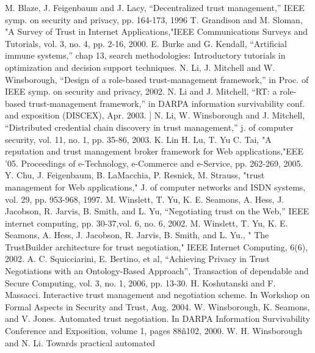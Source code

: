 \documentclass{llncs}
\begin{document}

\begin{thebibliography}{99.}%
 M. Blaze, J. Feigenbaum and J. Lacy, “Decentralized trust management,” IEEE
symp. on security and privacy, pp. 164-173, 1996
T. Grandison and M. Sloman, "A Survey of Trust in Internet Applications,"IEEE Communications Surveys and Tutorials, vol. 3, no. 4, pp. 2-16, 2000.
 E.  Burke and G. Kendall, “Artificial immune systems,”  chap 13,  search methodologies: Introductory tutorials in optimization and decision support techniques. 
N. Li, J. Mitchell and W. Winsborough, “Design of a role-based trust-management
framework,” in Proc. of IEEE symp. on security and privacy, 2002.
 N. Li and J. Mitchell, “RT: a role-based trust-management framework,” in DARPA
information survivability conf. and exposition (DISCEX), Apr. 2003.
 ] N. Li, W. Winsborough and J. Mitchell, “Distributed credential chain discovery in
trust management,” j. of computer security, vol. 11, no. 1, pp. 35-86, 2003.
 K. Lin   H. Lu,   T. Yu   C. Tai, "A reputation and trust management broker framework for Web applications,"EEE '05. Proceedings of e-Technology, e-Commerce and e-Service, pp. 262-269, 2005.
  Y. Chu, J. Feigenbaum, B. LaMacchia,  P. Resnick, M. Strauss, "trust management for Web applications," J. of computer networks and ISDN systems, vol. 29, pp. 953-968, 1997. 
 M. Winslett, T. Yu, K. E. Seamons, A. Hess, J. Jacobson, R. Jarvis, B. Smith, and L.
Yu, “Negotiating trust on the Web,” IEEE internet computing, pp. 30-37,vol. 6, no.
6, 2002.
 M. Winslett, T. Yu, K. E. Seamons, A. Hess, J. Jacobson, 
R. Jarvis, B. Smith, and L. Yu., " The TrustBuilder architecture for trust negotiation," IEEE Internet Computing, 6(6), 2002.
 A. C. Squicciarini, E. Bertino, et al, “Achieving
Privacy in Trust Negotiations with an Ontology-Based
Approach”, Transaction of dependable and Secure
Computing, vol. 3, no. 1, 2006, pp. 13-30.
 H. Koshutanski and F. Massacci. Interactive trust 
management and negotiation scheme. In Workshop on 
Formal Aspects in Security and Trust, Aug. 2004.
 W. Winsborough, K. Seamons, and V. Jones. Automated
trust negotiation. In DARPA Information Survivability Conference
and Exposition, volume 1, pages 88ñ102, 2000.
 W. H. Winsborough and N. Li. Towards practical automated

\end{thebibliography}
\end{document}
